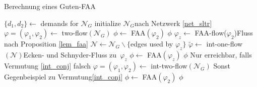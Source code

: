 \begin{algorithm}
\caption{Berechnung eines Guten-FAA}
\label{algo_gfaa}
\begin{algorithmic}[1]
	\State $\{d_1,d_2\} \gets $ demands for $\mathcal{N}_G$
	\State initialize $\mathcal{N}_G$\Comment nach Netzwerk \ref{net_sltr}
	\State $\varphi=(\varphi_1,\varphi_2) \gets $ two-flow$(\mathcal{N}_G)$\label{two_flow1}
			\State $\phi \gets $ FAA$(\varphi_2)$
			\State \Return $\phi$
		\Else
			\State $\varphi_z \gets$ FAA-flow($\varphi_2$)\Comment Fluss nach Proposition \ref{lem_faa}
			\State $\mathcal{N} \gets \mathcal{N}_G \backslash \{$edges used by $\varphi_z\}$\label{algo_check}
			\State $\tilde{\varphi} \gets $ int-one-flow$(\mathcal{N})$\Comment Ecken- und Schnyder-Fluss zu $\varphi_z$\label{int_one_flow1}
				\State $\phi \gets $ FAA$(\varphi_z)$
				\State \Return $\phi$
			\Else \Comment Nur erreichbar, falls Vermutung \ref{int_conj} falsch\label{sanity_check}
				\State $\varphi=(\varphi_1,\varphi_2) \gets $ int-two-flow$(\mathcal{N}_G)$
				\Comment Sonst Gegenbeispiel zu Vermutung\ref{int_conj}\label{int_two_flow1}
					\State $\phi \gets $ FAA$(\varphi_2)$
					\State \Return $\phi$
				\EndIf
			\EndIf
		\EndIf
	\EndIf
\EndIf
\EndProcedure
\end{algorithmic}
\end{algorithm}
